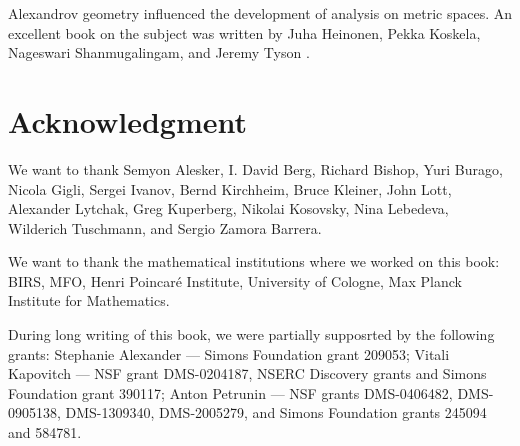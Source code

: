 Alexandrov geometry influenced the development of analysis on metric spaces. 
An excellent book on the subject was written by Juha Heinonen, Pekka Koskela, Nageswari Shanmugalingam, and Jeremy Tyson \cite{heinonen-koskela-shanmugalingam-tyson}.

\section*{Acknowledgment}
We want to thank 
Semyon Alesker,
I. David Berg,
Richard Bishop, 
Yuri Burago, 
Nicola Gigli,
Sergei Ivanov,
Bernd Kirchheim, 
Bruce Kleiner, 
John Lott,
Alexander Lytchak, 
Greg Kuperberg, 
Nikolai Kosovsky, 
Nina Lebedeva,
Wilderich Tuschmann, and
Sergio Zamora Barrera.


We want to thank the mathematical institutions where we worked on this book:
BIRS, 
MFO, 
Henri Poincar\'{e} Institute,
University of Cologne, 
Max Planck Institute for Mathematics.


During long writing of this book, we were partially supposrted by the following grants:
Stephanie Alexander --- 
Simons Foundation grant 209053;
Vitali Kapovitch ---  NSF grant DMS-0204187, NSERC Discovery grants and Simons Foundation grant 390117;
Anton Petrunin --- 
NSF grants
DMS-0406482,
DMS-0905138,
DMS-1309340,
DMS-2005279,
and Simons Foundation grants 
245094 and 584781.

